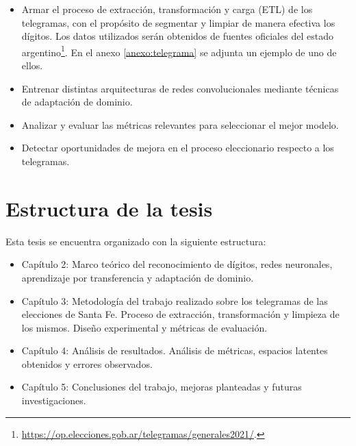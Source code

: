 \begin{itemize}
    \item Armar el proceso de extracción, transformación y carga (ETL) de los telegramas, con el propósito de segmentar y limpiar
          de manera efectiva los dígitos. Los datos utilizados serán obtenidos de fuentes oficiales del estado
          argentino\footnote{\href{https://op.elecciones.gob.ar/telegramas/generales2021/}{https://op.elecciones.gob.ar/telegramas/generales2021/}.}.
          En el anexo \ref{anexo:telegrama} se adjunta un ejemplo de uno de ellos.
    \item Entrenar distintas arquitecturas de redes convolucionales mediante técnicas de adaptación de dominio.
    \item Analizar y evaluar las métricas relevantes para seleccionar el mejor modelo.
    \item Detectar oportunidades de mejora en el proceso eleccionario respecto a los telegramas.
\end{itemize}

\section{Estructura de la tesis}

Esta tesis se encuentra organizado con la siguiente estructura:

\begin{itemize}
    \item Capítulo 2: Marco teórico del reconocimiento de dígitos, redes neuronales, aprendizaje por transferencia y adaptación
          de dominio.
    \item Capítulo 3: Metodología del trabajo realizado sobre los telegramas de las elecciones de Santa Fe. Proceso de
          extracción, transformación y limpieza de los mismos. Diseño experimental y métricas de evaluación.
    \item Capítulo 4: Análisis de resultados. Análisis de métricas, espacios latentes obtenidos y errores observados.
    \item Capítulo 5: Conclusiones del trabajo, mejoras planteadas y futuras investigaciones.
\end{itemize}